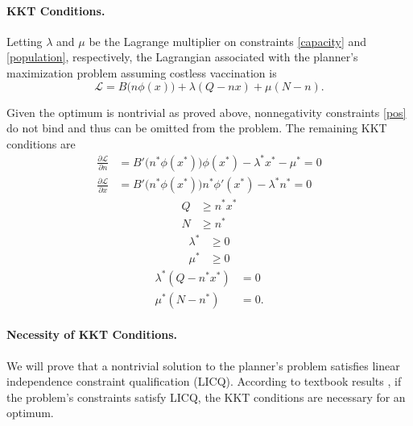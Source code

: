\documentclass[12pt]{article}
\newcommand{\efficacy}{\phi}
\newcommand{\benefit}{B}
\newcommand{\Lagrangian}{\mathscr{L}}
\begin{document}
\paragraph{KKT Conditions.}

Letting $\lambda$ and $\mu$ be the Lagrange multiplier on constraints
\eqref{capacity} and \eqref{population}, respectively, the Lagrangian
associated with the planner's maximization problem assuming costless
vaccination is
\begin{equation}
\label{a:Lagrangian_costless}
\Lagrangian = \benefit \bigl( n \efficacy(x) \bigr) + \lambda(Q - nx)
+ \mu(N - n).
\end{equation}

Given the optimum is nontrivial as proved above, nonnegativity
constraints \eqref{pos} do not bind and thus can be omitted from the
problem. The remaining KKT conditions are
\begin{align}
\frac{\partial \Lagrangian}{\partial n} & = \benefit'\!\bigl( n^* \efficacy(x^*) \bigr) \efficacy(x^*) - \lambda^* x^* - \mu^* = 0 \label{a:partial_L_partial_n} \\
\frac{\partial \Lagrangian}{\partial x} & = \benefit'\!\bigl( n^* \efficacy(x^*) \bigr) n^* \efficacy'(x^*) - \lambda^* n^* = 0 \label{a:partial_L_partial_x} 
\end{align}
\begin{align}
Q & \geq n^* x^*  \label{a:KKT_capacity} \\
N & \geq n^*  \label{a:KKT_population}
\end{align}
\begin{align}
\lambda^* & \geq 0 \label{a:lambda} \\
\mu^* & \geq 0 \label{a:mu}
\end{align}
\begin{align}
\lambda^* (Q - n^* x^*) & = 0 \label{a:cs_capacity} \\
\mu^* (N - n^*) & = 0. \label{a:cs_population}
\end{align}

\paragraph{Necessity of KKT Conditions.}

We will prove that a nontrivial solution to the planner's problem
satisfies linear independence constraint qualification (LICQ).
According to textbook results \citep[see, e.g.,][]{Solodov2011}, if
the problem's constraints satisfy LICQ, the KKT conditions are
necessary for an optimum.
\end{document}
